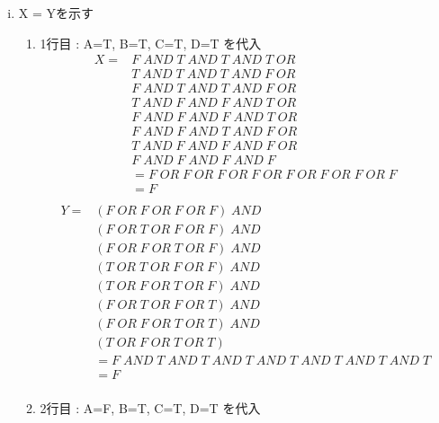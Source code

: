 \documentclass[dvipdfmx,10pt, a4j]{jarticle}
\theoremstyle{definition}
\begin{document}
\begin{enumerate}[i)]
        \item X = Yを示す\\
        \begin{enumerate}[1)]
            \item 1行目 : A=T, B=T, C=T, D=T を代入\\
            \begin{align*}
                X = &F\; AND\; T\; AND\; T\; AND\; T\; OR\\
                &T\; AND\; T\; AND\; T\; AND\; F\; OR\\
                &F\; AND\; T\; AND\; T\; AND\; F\; OR\\
                &T\; AND\; F\; AND\; F\; AND\; T\; OR\\
                &F\; AND\; F\; AND\; F\; AND\; T\; OR\\
                &F\; AND\; F\; AND\; T\; AND\; F\; OR\\
                &T\; AND\; F\; AND\; F\; AND\; F\; OR\\
                &F\; AND\; F\; AND\; F\; AND\; F\\
                &= F\; OR\; F\; OR\; F\; OR\; F\; OR\; F\; OR\; F\; OR\; F\; OR\; F\\
                &= F\\
            \end{align*}
            \begin{align*}
                Y = & (F\; OR\; F\; OR\; F\; OR\; F) \; AND\\
                & (F\; OR\; T\; OR\; F\; OR\; F)\; AND\\
                & (F\; OR\; F\; OR\; T\; OR\; F)\; AND\\
                & (T\; OR\; T\; OR\; F\; OR\; F)\; AND\\
                & (T\; OR\; F\; OR\; T\; OR\; F)\; AND\\
                & (F\; OR\; T\; OR\; F\; OR\; T)\; AND\\
                & (F\; OR\; F\; OR\; T\; OR\; T)\; AND\\
                & (T\; OR\; F\; OR\; T\; OR\; T)\\
                &= F\; AND\; T\; AND\; T\; AND\; T\; AND\; T\; AND\; T\; AND\; T\; AND\; T\\
                &= F\\
            \end{align*}
            \item 2行目 : A=F, B=T, C=T, D=T を代入\\

\end{enumerate}
\end{enumerate}
\end{document}
